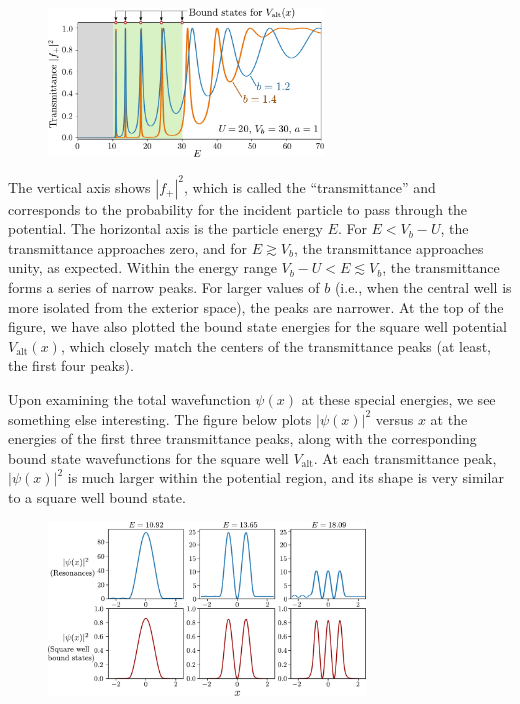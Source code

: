 \documentclass[pra,12pt]{revtex4}
\begin{document}
\begin{figure}[h]
  \centering\includegraphics[width=0.65\textwidth]{resonances}
\end{figure}

The vertical axis shows $|f_+|^2$, which is called the
``transmittance'' and corresponds to the probability for the incident
particle to pass through the potential.  The horizontal axis is the
particle energy $E$.  For $E < V_b-U$, the transmittance approaches
zero, and for $E \gtrsim V_b$, the transmittance approaches unity, as
expected.  Within the energy range $V_b-U < E \lesssim V_b$, the
transmittance forms a series of narrow peaks.  For larger values of
$b$ (i.e., when the central well is more isolated from the exterior
space), the peaks are narrower.  At the top of the figure, we have
also plotted the bound state energies for the square well potential
$V_{\mathrm{alt}}(x)$, which closely match the centers of the
transmittance peaks (at least, the first four peaks).

Upon examining the total wavefunction $\psi(x)$ at these special
energies, we see something else interesting.  The figure below plots
$|\psi(x)|^2$ versus $x$ at the energies of the first three
transmittance peaks, along with the corresponding bound state
wavefunctions for the square well $V_{\mathrm{alt}}$.  At each
transmittance peak, $|\psi(x)|^2$ is much larger within the potential
region, and its shape is very similar to a square well bound state.

\begin{figure}[h]
  \centering\includegraphics[width=0.75\textwidth]{resonancewavefunctions}
\end{figure}
\end{document}
